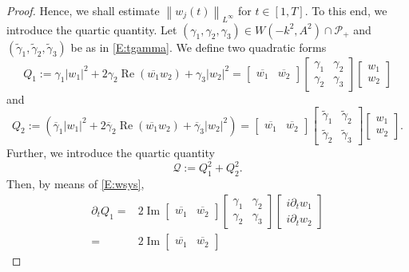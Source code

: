 \documentclass[11pt,a4paper,oneside]{amsart}
\theoremstyle{plain}
\theoremstyle{remark}
\numberwithin{equation}{section}
\renewcommand{\Im}{\operatorname{Im}}
\renewcommand{\Re}{\operatorname{Re}}
\newcommand{\norm}[1]{\left\lVert #1\right\rVert}
\theoremstyle{definition}
\begin{document}
\begin{proof}
Hence, we shall estimate 
$\norm{w_j(t)}_{L^\infty}$ for 
$t\in[1,T]$.
To this end, we introduce the quartic quantity.
Let $(\gamma_1,\gamma_2,\gamma_3) \in W(-k^2,A^2) \cap \mathcal{P}_+$
and $(\widetilde{\gamma}_1,\widetilde{\gamma}_2,\widetilde{\gamma}_3)$
be as in \eqref{E:tgamma}.
We define two quadratic forms
\[
	Q_1:= \gamma_1 |w_1|^2 + 2\gamma_2  \Re(\overline{w_1} w_2) + \gamma_3 |w_2|^2 = \begin{bmatrix}
	\overline{w_1} & \overline{w_2}
	\end{bmatrix}
	\begin{bmatrix}
	{\gamma}_1 & {\gamma}_2 \\ {\gamma}_2 & {\gamma}_3
	\end{bmatrix}
	\begin{bmatrix}
	w_1 \\ w_2
	\end{bmatrix}
\]
and
\[
	Q_2:= (\overline{\gamma}_1 |w_1|^2 + 2\overline{\gamma}_2  \Re(\overline{w_1} w_2) + \overline{\gamma}_3 |w_2|^2)
= 	\begin{bmatrix}
	\overline{w_1} & \overline{w_2}
	\end{bmatrix}
	\begin{bmatrix}
	\widetilde{\gamma}_1 & \widetilde{\gamma}_2 \\ \widetilde{\gamma}_2 & \widetilde{\gamma}_3
	\end{bmatrix}
	\begin{bmatrix}
	w_1 \\ w_2
	\end{bmatrix}.
\]
Further, we introduce the quartic quantity
\[
	\mathcal{Q}:= Q_1^2 + Q_2^2.
\]
Then, by means of \eqref{E:wsys},
\begin{align*}
	\partial_t Q_1
	={}& 2 \Im 
	\begin{bmatrix}
	\overline{w_1} & \overline{w_2}
	\end{bmatrix}
	\begin{bmatrix}
	\gamma_1 & \gamma_2 \\ \gamma_2 & \gamma_3
	\end{bmatrix}
	\begin{bmatrix}
	i \partial_t w_1 \\ i\partial_t w_2
	\end{bmatrix}\\
	={}& 
	2 \Im 
	\begin{bmatrix}
	\overline{w_1} & \overline{w_2}
	\end{bmatrix}

\end{align*}
\end{proof}
\end{document}

